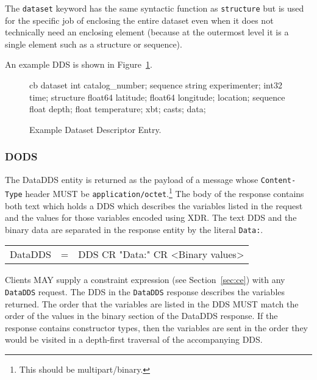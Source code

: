 \documentclass{article}
\begin{document}
The \texttt{dataset} keyword has the same syntactic function as
\texttt{structure} but is used for the specific job of enclosing the entire
dataset even when it does not technically need an enclosing element (because
at the outermost level it is a single element such as a structure or
sequence).

An example DDS is shown in Figure~\ref{fig:dds}.

\begin{figure}
\begin{vcode}{cb}
dataset {
   int catalog_number;
   sequence {
      string experimenter;
      int32 time;
      structure {
         float64 latitude;
         float64 longitude;
      } location;
      sequence {
         float depth;
         float temperature;
      } xbt;
   } casts;
} data;
\end{vcode}
\caption{Example Dataset Descriptor Entry.}
\label{fig:dds}
\end{figure}


\subsubsection{DODS}
\label{sec:dods}
The \ac{DataDDS} entity is returned as the payload of a message whose
\texttt{Content-Type} header MUST be
\texttt{application/octet}.\footnote{This should be multipart/binary.} The
body of the response contains both text which holds a \ac{DDS} which
describes the variables listed in the request and the values for those
variables encoded using XDR\cite{xdr}. The text \ac{DDS} and the binary data
are separated in the response entity by the literal \texttt{Data:}.
\begin{ttfamily}
\begin{center}
\begin{tabular}{lll}
DataDDS & = & DDS CR "Data:" CR <Binary values>
\end{tabular}
\end{center}
\end{ttfamily}

Clients MAY supply a constraint expression (see Section~\ref{sec:ce}) with
any \texttt{DataDDS} request. The \ac{DDS} in the \texttt{DataDDS} response
describes the variables returned. The order that the variables are listed in
the \ac{DDS} MUST match the order of the values in the binary section of the
\ac{DataDDS} response. If the response contains constructor types, then the
variables are sent in the order they would be visited in a depth-first
traversal of the accompanying \ac{DDS}.
\end{document}
